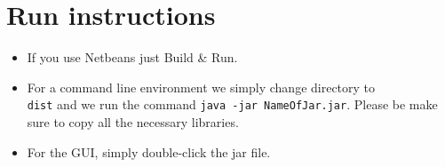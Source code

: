 \documentclass[letterpaper,twocolumn,10pt]{article}
\begin{document}
\section{Run instructions}
\begin{itemize}
	\item If you use Netbeans just Build \& Run.
	\item For a command line environment we simply change directory to {\tt \\dist} and we run the command {\tt java -jar NameOfJar.jar}. Please be make sure to copy all the necessary libraries.
	\item For the GUI, simply double-click the jar file.
\end{itemize}
\end{document}
